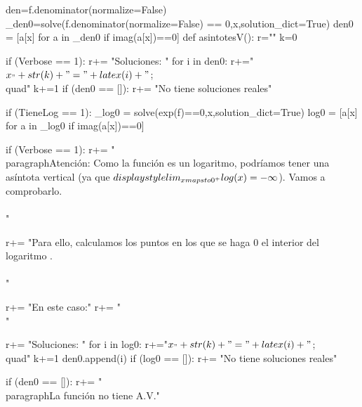 \begin{sagesilent}
den=f.denominator(normalize=False)
_den0=solve(f.denominator(normalize=False) == 0,x,solution_dict=True)
den0 = [a[x] for a in _den0 if imag(a[x])==0]
def asintotesV():
    r=""
    k=0

    if (Verbose == 1):
        r+= "Soluciones: "
        for i in den0:
            r+="$x_"+str(k)+"="+latex(i)+" $;\\quad"
            k+=1
        if (den0 == []):
            r+= "No tiene soluciones reales"

    if (TieneLog == 1):
        _log0 = solve(exp(f)==0,x,solution_dict=True)
        log0 = [a[x] for a in _log0 if imag(a[x])==0]  

        if (Verbose == 1):
            r+= "\\paragraph{Atención: } Como la función es un logaritmo, podríamos tener una asíntota vertical (ya que $\\displaystyle\\lim_{x\\mapsto 0^+} \\log(x) = -\infty$). Vamos a comprobarlo.\\\\"

            r+= "Para ello, calculamos los puntos en los que se haga 0 el interior del logaritmo .\\\\"

        
            r+= "En este caso:"
        r+= "\\[ "+latex(exp(f))+"= 0 \\]"

        r+= "Soluciones: "
        for i in log0:
            r+="$x_"+str(k)+"="+latex(i)+" $;\\quad"
            k+=1
            den0.append(i)
        if (log0 == []):
            r+= "No tiene soluciones reales"

    if (den0 == []):
        r+= "\\paragraph{La función no tiene A.V.}"


\end{sagesilent}
